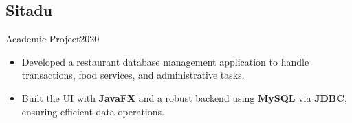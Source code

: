 \subsection{Sitadu}{Academic Project}{2020}
\begin{itemize}
    \item Developed a restaurant database management application to handle transactions, food services, and administrative tasks.
    \item Built the UI with \textbf{JavaFX} and a robust backend using \textbf{MySQL} via \textbf{JDBC}, ensuring efficient data operations.
\end{itemize}
